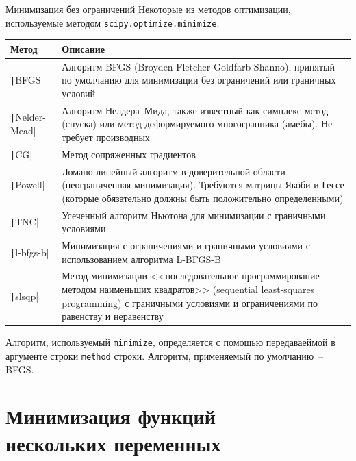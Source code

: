 \documentclass[aspectratio=169, mathserif]{beamer}	%
\begin{document}
\begin{frame}[fragile]{Минимизация без ограничений}
\scriptsize
Некоторые из методов оптимизации, используемые методом \texttt{scipy.optimize.minimize}:
\begin{table}[h!]
\begin{tabular}{|p{}|p{}|}
\hline
\textbf{Метод} & \textbf{Описание} \\
\hline
\texttt|BFGS| & Алгоритм BFGS (Broyden-Fletcher-Goldfarb-Shanno), принятый по умолчанию для минимизации без ограничений или граничных условий \\
\hline
\texttt|Nelder-Mead| & Алгоритм Нелдера–Мида, также известный как симплекс-метод (спуска) или
метод деформируемого многогранника (амебы). Не требует производных \\
\hline
\texttt|CG| & Метод сопряженных градиентов \\
\hline
\texttt|Powell| & Ломано-линейный алгоритм в доверительной области (неограниченная минимизация). Требуются матрицы Якоби и Гессе (которые обязательно должны быть положительно определенными) \\
\hline
\texttt|TNC| & Усеченный алгоритм Ньютона для минимизации с граничными условиями \\
\hline
\texttt|l-bfgs-b| & Минимизация с ограничениями и граничными условиями с использованием алгоритма L-BFGS-B \\
\hline
\texttt|slsqp| & Метод минимизации <<последовательное программирование методом наименьших квадратов>> (sequential least-squares programming) с граничными условиями и ограничениями по равенству и неравенству \\
\hline
\end{tabular}
\end{table}
\vfill
Алгоритм, используемый \texttt{minimize}, определяется с помощью передаваеймой в аргументе строки \texttt{method} строки. Алгоритм, применяемый по умолчанию~-- BFGS.
\vfill
\end{frame}


\section{Минимизация функций \\ нескольких переменных}
\sectionframe
\end{document}
